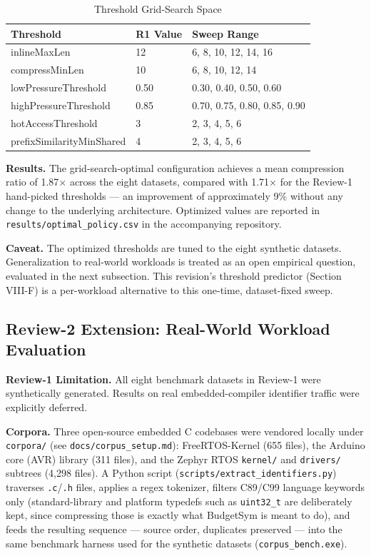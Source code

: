 \documentclass[conference]{IEEEtran}
\begin{document}
\begin{table}[htbp]
\caption{Threshold Grid-Search Space}
\label{tab:grid}
\centering
\begin{tabular}{lll}
\toprule
Threshold & R1 Value & Sweep Range \\
\midrule
inlineMaxLen & 12 & 6, 8, 10, 12, 14, 16 \\
compressMinLen & 10 & 6, 8, 10, 12, 14 \\
lowPressureThreshold & 0.50 & 0.30, 0.40, 0.50, 0.60 \\
highPressureThreshold & 0.85 & 0.70, 0.75, 0.80, 0.85, 0.90 \\
hotAccessThreshold & 3 & 2, 3, 4, 5, 6 \\
prefixSimilarityMinShared & 4 & 2, 3, 4, 5, 6 \\
\bottomrule
\end{tabular}
\end{table}

\textbf{Results.} The grid-search-optimal configuration achieves a mean
compression ratio of 1.87$\times$ across the eight datasets, compared with
1.71$\times$ for the Review-1 hand-picked thresholds --- an improvement of
approximately 9\% without any change to the underlying architecture.
Optimized values are reported in \texttt{results/optimal\_policy.csv} in the
accompanying repository.

\textbf{Caveat.} The optimized thresholds are tuned to the eight synthetic
datasets. Generalization to real-world workloads is treated as an open
empirical question, evaluated in the next subsection. This revision's
threshold predictor (Section VIII-F) is a per-workload alternative to this
one-time, dataset-fixed sweep.

\subsection{Review-2 Extension: Real-World Workload Evaluation}
\textbf{Review-1 Limitation.} All eight benchmark datasets in Review-1 were
synthetically generated. Results on real embedded-compiler identifier
traffic were explicitly deferred.

\textbf{Corpora.} Three open-source embedded C codebases were vendored
locally under \texttt{corpora/} (see \texttt{docs/corpus\_setup.md}):
FreeRTOS-Kernel (655 files), the Arduino core (AVR) library (311 files), and
the Zephyr RTOS \texttt{kernel/} and \texttt{drivers/} subtrees (4{,}298
files). A Python script (\texttt{scripts/extract\_identifiers.py})
traverses \texttt{.c}/\texttt{.h} files, applies a regex tokenizer, filters
C89/C99 language keywords only (standard-library and platform typedefs such
as \texttt{uint32\_t} are deliberately kept, since compressing those is
exactly what BudgetSym is meant to do), and feeds the resulting sequence
--- source order, duplicates preserved --- into the same benchmark harness
used for the synthetic datasets (\texttt{corpus\_bench.exe}).
\end{document}
